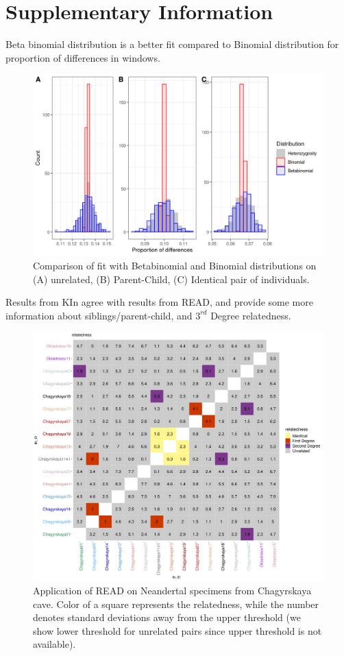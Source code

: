 \documentclass[12pt, letterpaper]{article}
\begin{document}
\section{Supplementary Information}
Beta binomial distribution is a better fit compared to Binomial distribution for proportion of differences in windows.
\begin{figure}[htp]
    \centering
    \includegraphics[width=18cm]{supplementary_info/plots/binom.png}
    \caption{Comparison of fit with Betabinomial and Binomial distributions on (A) unrelated, (B) Parent-Child, (C) Identical pair of individuals.}
    \label{figS1}
\end{figure}

Results from KIn agree with results from READ, and provide some more information about siblings/parent-child, and $3^{rd}$ Degree relatedness. 
\begin{figure}[htp]
    \centering
    \includegraphics[width=18cm]{supplementary_info/plots/fil0_read_plot.png}
    \caption{Application of READ on Neandertal specimens from Chagyrskaya cave. Color of a square represents the relatedness, while the number denotes standard deviations away from the upper threshold (we show lower threshold for unrelated pairs since upper threshold is not available).}
    \label{figS2}
\end{figure}
\end{document}
